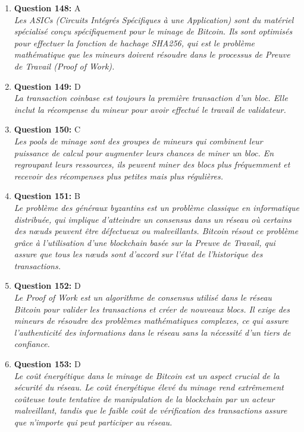 \documentclass[12pt,a4paper]{article}
\begin{document}
\begin{enumerate}
\item \textbf{Question 148:} A
\\ \textit{Les ASICs (Circuits Intégrés Spécifiques à une Application) sont du matériel spécialisé conçu spécifiquement pour le minage de Bitcoin. Ils sont optimisés pour effectuer la fonction de hachage SHA256, qui est le problème mathématique que les mineurs doivent résoudre dans le processus de Preuve de Travail (Proof of Work).}

\item \textbf{Question 149:} D
\\ \textit{La transaction coinbase est toujours la première transaction d'un bloc. Elle inclut la récompense du mineur pour avoir effectué le travail de validateur.}

\item \textbf{Question 150:} C
\\ \textit{Les pools de minage sont des groupes de mineurs qui combinent leur puissance de calcul pour augmenter leurs chances de miner un bloc. En regroupant leurs ressources, ils peuvent miner des blocs plus fréquemment et recevoir des récompenses plus petites mais plus régulières.}

\item \textbf{Question 151:} B
\\ \textit{Le problème des généraux byzantins est un problème classique en informatique distribuée, qui implique d'atteindre un consensus dans un réseau où certains des nœuds peuvent être défectueux ou malveillants. Bitcoin résout ce problème grâce à l'utilisation d'une blockchain basée sur la Preuve de Travail, qui assure que tous les nœuds sont d'accord sur l'état de l'historique des transactions.}

\item \textbf{Question 152:} D
\\ \textit{Le Proof of Work est un algorithme de consensus utilisé dans le réseau Bitcoin pour valider les transactions et créer de nouveaux blocs. Il exige des mineurs de résoudre des problèmes mathématiques complexes, ce qui assure l'authenticité des informations dans le réseau sans la nécessité d'un tiers de confiance.}

\item \textbf{Question 153:} D
\\ \textit{Le coût énergétique dans le minage de Bitcoin est un aspect crucial de la sécurité du réseau. Le coût énergétique élevé du minage rend extrêmement coûteuse toute tentative de manipulation de la blockchain par un acteur malveillant, tandis que le faible coût de vérification des transactions assure que n'importe qui peut participer au réseau.}


\end{enumerate}
\end{document}
